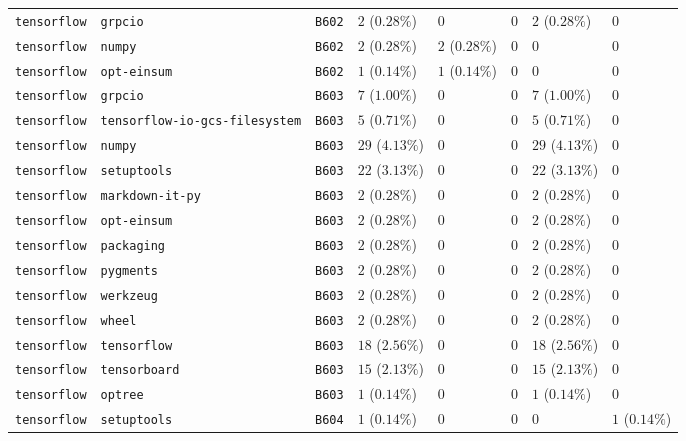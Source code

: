\begin{table}
\begin{tabular}{llllllll}
\texttt{tensorflow} & \texttt{grpcio} & \texttt{B602} & $2$ ($0.28\%$) & $0$ & $0$ & $2$ ($0.28\%$) & $0$ \\
\texttt{tensorflow} & \texttt{numpy} & \texttt{B602} & $2$ ($0.28\%$) & $2$ ($0.28\%$) & $0$ & $0$ & $0$ \\
\texttt{tensorflow} & \texttt{opt-einsum} & \texttt{B602} & $1$ ($0.14\%$) & $1$ ($0.14\%$) & $0$ & $0$ & $0$ \\
\texttt{tensorflow} & \texttt{grpcio} & \texttt{B603} & $7$ ($1.00\%$) & $0$ & $0$ & $7$ ($1.00\%$) & $0$ \\
\texttt{tensorflow} & \texttt{tensorflow-io-gcs-filesystem} & \texttt{B603} & $5$ ($0.71\%$) & $0$ & $0$ & $5$ ($0.71\%$) & $0$ \\
\texttt{tensorflow} & \texttt{numpy} & \texttt{B603} & $29$ ($4.13\%$) & $0$ & $0$ & $29$ ($4.13\%$) & $0$ \\
\texttt{tensorflow} & \texttt{setuptools} & \texttt{B603} & $22$ ($3.13\%$) & $0$ & $0$ & $22$ ($3.13\%$) & $0$ \\
\texttt{tensorflow} & \texttt{markdown-it-py} & \texttt{B603} & $2$ ($0.28\%$) & $0$ & $0$ & $2$ ($0.28\%$) & $0$ \\
\texttt{tensorflow} & \texttt{opt-einsum} & \texttt{B603} & $2$ ($0.28\%$) & $0$ & $0$ & $2$ ($0.28\%$) & $0$ \\
\texttt{tensorflow} & \texttt{packaging} & \texttt{B603} & $2$ ($0.28\%$) & $0$ & $0$ & $2$ ($0.28\%$) & $0$ \\
\texttt{tensorflow} & \texttt{pygments} & \texttt{B603} & $2$ ($0.28\%$) & $0$ & $0$ & $2$ ($0.28\%$) & $0$ \\
\texttt{tensorflow} & \texttt{werkzeug} & \texttt{B603} & $2$ ($0.28\%$) & $0$ & $0$ & $2$ ($0.28\%$) & $0$ \\
\texttt{tensorflow} & \texttt{wheel} & \texttt{B603} & $2$ ($0.28\%$) & $0$ & $0$ & $2$ ($0.28\%$) & $0$ \\
\texttt{tensorflow} & \texttt{tensorflow} & \texttt{B603} & $18$ ($2.56\%$) & $0$ & $0$ & $18$ ($2.56\%$) & $0$ \\
\texttt{tensorflow} & \texttt{tensorboard} & \texttt{B603} & $15$ ($2.13\%$) & $0$ & $0$ & $15$ ($2.13\%$) & $0$ \\
\texttt{tensorflow} & \texttt{optree} & \texttt{B603} & $1$ ($0.14\%$) & $0$ & $0$ & $1$ ($0.14\%$) & $0$ \\
\texttt{tensorflow} & \texttt{setuptools} & \texttt{B604} & $1$ ($0.14\%$) & $0$ & $0$ & $0$ & $1$ ($0.14\%$) \\

\end{tabular}
\end{table}
